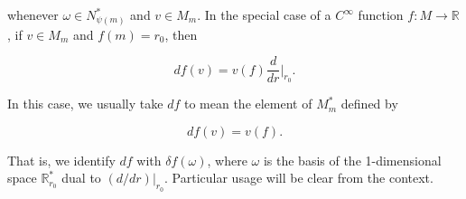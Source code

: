 whenever $\omega \in N_{\psi(m)}^{*}$ and $v \in M_{m}$. In the special case of a $C^{\infty}$ function $f: M \to \mathbb{R}$, if $v \in M_{m}$ and $f(m) = r_{0}$, then

\begin{equation}
	\label{eq:1.22:5}
	d f(v)=v(f)\frac{d}{d r}\bigg|_{r_{0}}.
\end{equation}

In this case, we usually take $df$ to mean the element of $M_{m}^{*}$ defined by

\begin{equation}
	\label{eq:1.22:6}
	d f(v)=v(f).
\end{equation}

That is, we identify $df$ with $\delta f(\omega)$, where $\omega$ is the basis
of the 1-dimensional space $\mathbb{R}_{r_{0}}^{*}$ dual to $(d/dr)|_{r_{0}}$.
Particular usage will be clear from the context.


